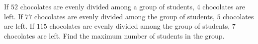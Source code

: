  If $52$ chocolates are evenly divided among a group of students, $4$ chocolates are left. If $77$ chocolates are evenly divided among the group of students, $5$ chocolates are left. If $115$ chocolates are evenly divided among the group of students, $7$ chocolates are left. Find the maximum number of students in the group.

